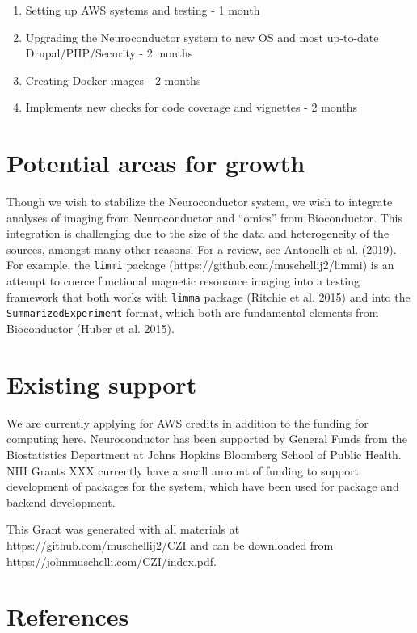 \documentclass[]{elsarticle} %
\providecommand{\tightlist}{%
  \setlength{\itemsep}{0pt}\setlength{\parskip}{0pt}}
\begin{document}
\begin{enumerate}
\def\labelenumi{\arabic{enumi}.}
\tightlist
\item
  Setting up AWS systems and testing - 1 month
\item
  Upgrading the Neuroconductor system to new OS and most up-to-date Drupal/PHP/Security - 2 months
\item
  Creating Docker images - 2 months
\item
  Implements new checks for code coverage and vignettes - 2 months
\end{enumerate}

\hypertarget{potential-areas-for-growth}{%
\section{Potential areas for growth}\label{potential-areas-for-growth}}

Though we wish to stabilize the Neuroconductor system, we wish to integrate analyses of imaging from Neuroconductor and ``omics'' from Bioconductor. This integration is challenging due to the size of the data and heterogeneity of the sources, amongst many other reasons. For a review, see Antonelli et al. (2019). For example, the \texttt{limmi} package (https://github.com/muschellij2/limmi) is an attempt to coerce functional magnetic resonance imaging into a testing framework that both works with \texttt{limma} package (Ritchie et al. 2015) and into the \texttt{SummarizedExperiment} format, which both are fundamental elements from Bioconductor (Huber et al. 2015).

\hypertarget{existing-support}{%
\section{Existing support}\label{existing-support}}

We are currently applying for AWS credits in addition to the funding for computing here. Neuroconductor has been supported by General Funds from the Biostatistics Department at Johns Hopkins Bloomberg School of Public Health. NIH Grants XXX currently have a small amount of funding to support development of packages for the system, which have been used for package and backend development.

This Grant was generated with all materials at https://github.com/muschellij2/CZI and can be downloaded from https://johnmuschelli.com/CZI/index.pdf.

\hypertarget{references}{%
\section*{References}\label{references}}
\end{document}
